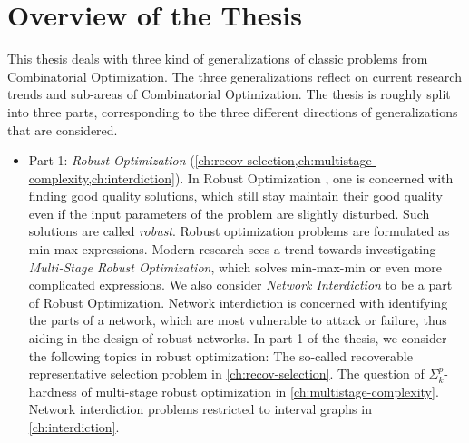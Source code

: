 \section{Overview of the Thesis}

This thesis deals with three kind of generalizations of classic problems from Combinatorial Optimization. 
The three generalizations reflect on current research trends and sub-areas of Combinatorial Optimization. 
The thesis is roughly split into three parts, corresponding to the three different directions of generalizations that are considered.

\begin{itemize}
\item Part 1: \emph{Robust Optimization} (\cref{ch:recov-selection,ch:multistage-complexity,ch:interdiction}). In Robust Optimization \cite{ben2009robust}, one is concerned with finding good quality solutions, 
which still stay maintain their good quality even if the input parameters of the problem are slightly disturbed. Such solutions are called \emph{robust}.
Robust optimization problems are formulated as min-max expressions. Modern research sees a trend towards investigating \emph{Multi-Stage Robust Optimization}, which solves min-max-min or even more complicated expressions.
 We also consider \emph{Network Interdiction} to be a part of Robust Optimization. 
Network interdiction is concerned with identifying the parts of a network, which are most vulnerable to attack or failure, thus aiding in the design of robust networks. 
In part 1 of the thesis, we consider the following topics in robust optimization: The so-called recoverable representative selection problem in \cref{ch:recov-selection}. The question of $\Sigma^p_k$-hardness of multi-stage robust optimization in \cref{ch:multistage-complexity}. 
Network interdiction problems restricted to interval graphs in \cref{ch:interdiction}.


\end{itemize}
